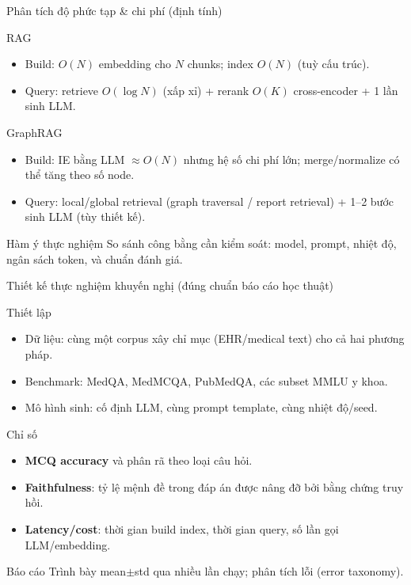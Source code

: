 \documentclass[aspectratio=169,10pt]{beamer}
\begin{document}
\begin{frame}{Phân tích độ phức tạp \& chi phí (định tính)}
\small
\begin{block}{RAG}
\begin{itemize}
  \item Build: \(O(N)\) embedding cho \(N\) chunks; index \(O(N)\) (tuỳ cấu trúc).
  \item Query: retrieve \(O(\log N)\) (xấp xỉ) + rerank \(O(K)\) cross-encoder + 1 lần sinh LLM.
\end{itemize}
\end{block}

\begin{block}{GraphRAG}
\begin{itemize}
  \item Build: IE bằng LLM \(\approx O(N)\) nhưng hệ số chi phí lớn; merge/normalize có thể tăng theo số node.
  \item Query: local/global retrieval (graph traversal / report retrieval) + 1--2 bước sinh LLM (tùy thiết kế).
\end{itemize}
\end{block}

\begin{block}{Hàm ý thực nghiệm}
So sánh công bằng cần kiểm soát: model, prompt, nhiệt độ, ngân sách token, và chuẩn đánh giá.
\end{block}
\end{frame}

\begin{frame}{Thiết kế thực nghiệm khuyến nghị (đúng chuẩn báo cáo học thuật)}
\small
\begin{block}{Thiết lập}
\begin{itemize}
  \item Dữ liệu: cùng một corpus xây chỉ mục (EHR/medical text) cho cả hai phương pháp.
  \item Benchmark: MedQA, MedMCQA, PubMedQA, các subset MMLU y khoa.
  \item Mô hình sinh: cố định LLM, cùng prompt template, cùng nhiệt độ/seed.
\end{itemize}
\end{block}

\begin{block}{Chỉ số}
\begin{itemize}
  \item \textbf{MCQ accuracy} và phân rã theo loại câu hỏi.
  \item \textbf{Faithfulness}: tỷ lệ mệnh đề trong đáp án được nâng đỡ bởi bằng chứng truy hồi.
  \item \textbf{Latency/cost}: thời gian build index, thời gian query, số lần gọi LLM/embedding.
\end{itemize}
\end{block}

\begin{block}{Báo cáo}
Trình bày mean\(\pm\)std qua nhiều lần chạy; phân tích lỗi (error taxonomy).
\end{block}
\end{frame}
\end{document}
